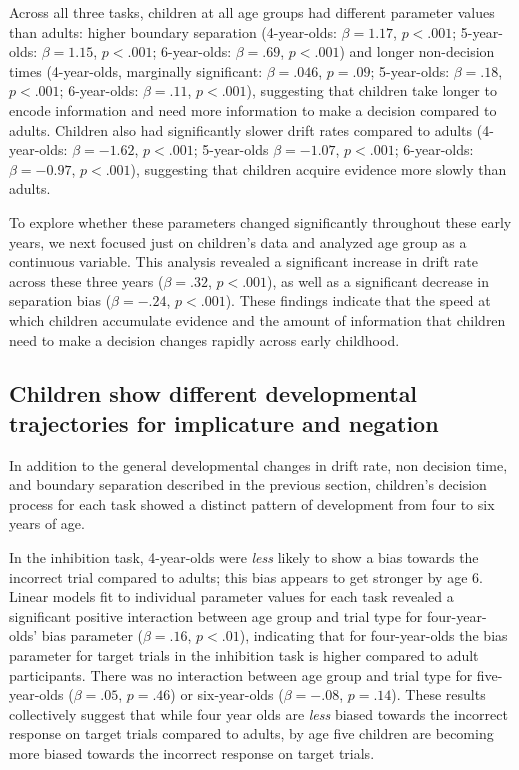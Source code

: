 \documentclass[10pt,letterpaper]{article}
\begin{document}
Across all three tasks, children at all age groups had different parameter values than adults: higher boundary separation (4-year-olds: $\beta = 1.17$, $p <.001$; 5-year-olds: $\beta = 1.15$, $p <.001$; 6-year-olds: $\beta = .69$, $p <.001$) and longer non-decision times (4-year-olds, marginally significant: $\beta = .046$, $p = .09$; 5-year-olds: $\beta = .18$, $p <.001$; 6-year-olds: $\beta = .11$, $p <.001$), suggesting that children take longer to encode information and need more information to make a decision compared to adults. Children also had significantly slower drift rates compared to adults
(4-year-olds: $\beta = -1.62$, $p <.001$; 5-year-olds $\beta = -1.07$, $p <.001$; 6-year-olds: $\beta = -0.97$, $p <.001$), suggesting that children acquire evidence more slowly than adults.

To explore whether these parameters changed significantly throughout these early years, we next focused just on children's data and analyzed age group as a continuous variable. This analysis revealed a significant increase in drift rate across these three years ($\beta = .32$, $p < .001$), as well as a significant decrease in separation bias ($\beta = -.24$, $p < .001$). These findings indicate that the speed at which children accumulate evidence and the amount of information that children need to make a decision changes rapidly across early childhood.

\subsection{Children show different developmental trajectories for implicature and negation}

In addition to the general developmental changes in drift rate, non decision time, and boundary separation described in the previous section, children's decision process for each task showed a distinct pattern of development from four to six years of age.

In the inhibition task, 4-year-olds were \emph{less} likely to show a bias towards the incorrect trial compared to adults; this bias appears to get stronger by age 6. Linear models fit to individual parameter values for each task revealed a significant positive interaction between age group and trial type for four-year-olds' bias parameter ($\beta = .16$, $p< .01$), indicating that for four-year-olds the bias parameter for target trials in the inhibition task is higher compared to adult participants. There was no interaction between age group and trial type for five-year-olds ($\beta = .05$, $p = .46$) or six-year-olds ($\beta = -.08$, $p = .14$). These results collectively suggest that while four year olds are \emph{less} biased towards the incorrect response on target trials compared to adults, by age five children are becoming more biased towards the incorrect response on target trials.
\end{document}
